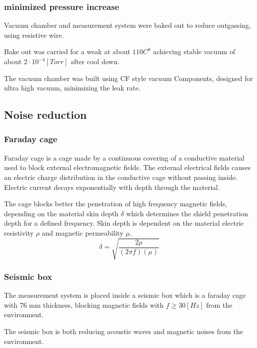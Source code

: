 \documentclass[\main/master.tex]{subfiles}
\begin{document}
\subsubsection{minimized pressure increase}
\par\noindent
Vacuum chamber and measurement system were baked out to reduce outgassing, using resistive wire. 
\par\noindent
Bake out was carried for a weak at about $110 C^0$ achieving stable vacuum of about $2\cdot 10^{−4} [Torr]$ after cool down.
\par\noindent
The vacuum chamber was built using CF style vacuum Components, designed for ultra high vacuum, minimizing the leak rate.


\subsection{Noise reduction}
\subsubsection{Faraday cage}
\par\noindent
Faraday cage is a cage made by a continuous covering of a conductive material used to block external electromagnetic fields. The external electrical fields causes an electric charge distribution in the conductive cage without passing inside. Electric current decays exponentially with depth through the material.

\par\noindent
The cage blocks better the penetration of high frequency magnetic fields, depending on the material skin depth $\delta$ which determines the shield penetration depth for a defined frequency. Skin depth is dependent on the material electric resistivity $\rho$ and magnetic permeability $\mu$. 
\begin{equation}
\delta = \sqrt{\frac{2\rho}{(2\pi f)(\mu)} }    \label{eqn:skin depth}
\end{equation}

\subsubsection{Seismic box}
The measurement system is placed inside a seismic box which is a faraday cage with 76 mm thickness, blocking magnetic fields with $f \ge 30 [Hz]$ from the environment.
\par\noindent
The seismic box is both reducing acoustic waves and magnetic noises from the environment.
\end{document}
